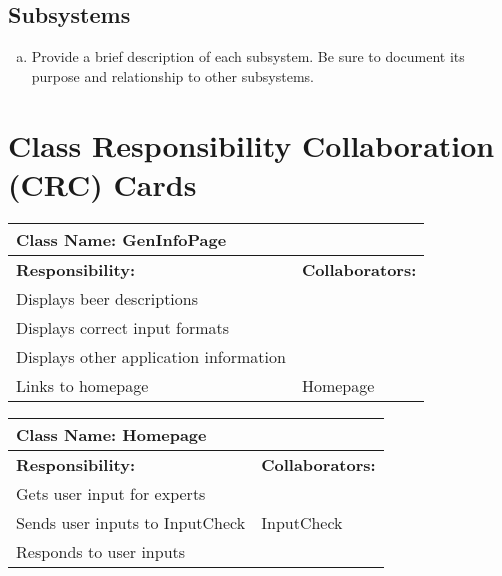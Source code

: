 \documentclass[]{article}
\begin{document}
\subsection{Subsystems}
\label{sub:subsystems}
\begin{enumerate}[a)]
	\item Provide a brief description of each subsystem. Be sure to document its purpose and relationship to other subsystems.
\end{enumerate}

	
\section{Class Responsibility Collaboration (CRC) Cards}
\label{sec:class_responsibility_collaboration_crc_cards}

\begin{table}[ht]
		\centering
		\begin{tabular}{|p{5cm}|p{5cm}|}
			\hline 
			\multicolumn{2}{|l|}{\textbf{Class Name: GenInfoPage}} \\
			\hline
			\textbf{Responsibility:} & \textbf{Collaborators:} \\
			\hline
			Displays beer descriptions & \\
			\hline				
			Displays correct input formats & \\
			\hline
			Displays other application information &  \\
			\hline
			Links to homepage & Homepage \\
			\hline
		\end{tabular}
	\end{table}	
	
\begin{table}[ht]
		\centering
		\begin{tabular}{|p{5cm}|p{5cm}|}
			\hline 
			\multicolumn{2}{|l|}{\textbf{Class Name: Homepage}} \\
			\hline
			\textbf{Responsibility:} & \textbf{Collaborators:} \\
			\hline
			Gets user input for experts & \\
			\hline
			Sends user inputs to InputCheck & InputCheck\\	
			\hline
			Responds to user inputs & \\	
			\hline
		\end{tabular}
	\end{table}	
\end{document}

